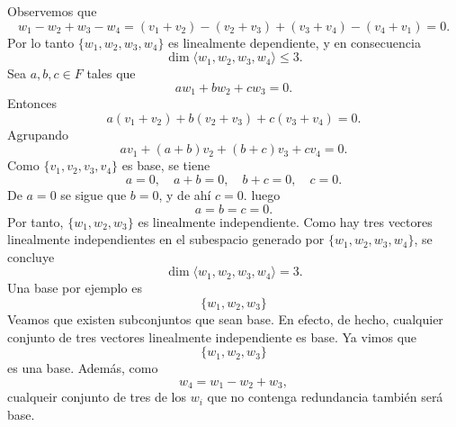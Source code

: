 \documentclass[12pt,a4paper]{article}
\begin{document}
    \begin{solucion}
        Observemos que
        \begin{equation*}
            w_{1}-w_{2}+w_{3}-w_{4}=(v_{1}+v_{2})-(v_{2}+v_{3})+(v_{3}+v_{4})-(v_{4}+v_{1})=0.
        \end{equation*}
        Por lo tanto $\{w_{1},w_{2},w_{3},w_{4}\}$ es linealmente dependiente, y en consecuencia
        \begin{equation*}
            \dim\langle w_{1},w_{2},w_{3},w_{4}\rangle\leq3.
        \end{equation*}
        Sea $a,b,c\in F$ tales que
        \begin{equation*}
            aw_{1}+bw_{2}+cw_{3}=0.
        \end{equation*}
        Entonces
        \begin{equation*}
            a(v_{1}+v_{2})+b(v_{2}+v_{3})+c(v_{3}+v_{4})=0.
        \end{equation*}
        Agrupando
        \begin{equation*}
            av_{1}+(a+b)v_{2}+(b+c)v_{3}+cv_{4}=0.
        \end{equation*}
        Como $\{v_{1},v_{2},v_{3},v_{4}\}$ es base, se tiene
        \begin{equation*}
            a=0,\quad a+b=0,\quad b+c=0,\quad c=0.
        \end{equation*}
        De $a=0$ se sigue que $b=0$, y de ahí $c=0$. luego
        \begin{equation*}
            a=b=c=0.
        \end{equation*}
        Por tanto, $\{w_{1},w_{2},w_{3}\}$ es linealmente independiente. Como hay
        tres vectores linealmente independientes en el subespacio generado por $\{w_{1},w_{2},w_{3},w_{4}\}$,
        se concluye
        \begin{equation*}
            \dim\langle w_{1},w_{2},w_{3},w_{4}\rangle=3.
        \end{equation*}
        Una base por ejemplo es
        \begin{equation*}
            \{w_{1},w_{2},w_{3}\}
        \end{equation*}
        Veamos que existen subconjuntos que sean base. En efecto, de hecho, cualquier conjunto de tres vectores
        linealmente independiente es base. Ya vimos que
        \begin{equation*}
            \{w_{1},w_{2},w_{3}\}
        \end{equation*}
        es una base. Además, como
        \begin{equation*}
            w_{4}=w_{1}-w_{2}+w_{3},
        \end{equation*}
        cualqueir conjunto de tres de los $w_{i}$ que no contenga redundancia también será base.
    \end{solucion}
\end{document}
